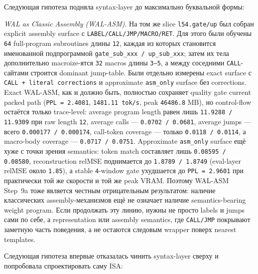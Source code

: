 \begin{itemize}[leftmargin=1.5em]
Следующая гипотеза подняла syntax-layer до максимально буквальной формы:

\emph{WAL as Classic Assembly (WAL-ASM)}. На том же slice
\texttt{l54.gate/up} был собран explicit assembly surface с
\texttt{LABEL/CALL/JMP/MACRO/RET}. Для этого были обучены \texttt{64}
full-program subroutines длины \texttt{12}, каждая из которых становится
именованной подпрограммой \texttt{gate\_sub\_xxx / up\_sub\_xxx}; затем их
тела дополнительно macroize-ятся \texttt{32} macros длины \texttt{3--5}, а
между соседними \texttt{CALL}-сайтами строится dominant jump-table. Были
отдельно измерены exact surface с \texttt{CALL + literal corrections} и
approximate \texttt{asm\_only} surface без corrections. Exact WAL-ASM, как и
должно быть, полностью сохраняет quality gate current packed path
(\texttt{PPL = 2.4081}, \texttt{1481.11 tok/s}, peak \texttt{46486.8} MB),
но control-flow остаётся только trace-level: average program length равен
лишь \texttt{11.9288 / 11.9309} при raw length \texttt{12}, average calls ---
\texttt{0.0702 / 0.0681}, average jumps --- всего
\texttt{0.000177 / 0.000174}, call-token coverage --- только
\texttt{0.0118 / 0.0114}, а macro-body coverage ---
\texttt{0.0717 / 0.0751}. Approximate \texttt{asm\_only} surface ещё хуже с
точки зрения semantics: token match составляет лишь
\texttt{0.08595 / 0.08580}, reconstruction relMSE поднимается до
\texttt{1.8789 / 1.8749} (eval-layer relMSE около \texttt{1.85}), а stable
\texttt{4}-window gate ухудшается до \texttt{PPL = 2.9601} при практически
той же скорости и той же peak VRAM. Поэтому WAL-ASM Step~9a тоже является
честным отрицательным результатом: наличие классических assembly-механизмов
ещё не означает наличие semantics-bearing weight program. Если продолжать
эту линию, нужны не просто labels и jumps сами по себе, а representation или
assembly semantics, где \texttt{CALL/JMP} покрывают заметную часть поведения,
а не остаются следовым wrapper поверх nearest templates.

Следующая гипотеза впервые отказалась чинить syntax-layer сверху и попробовала
спроектировать саму ISA:


\end{itemize}
